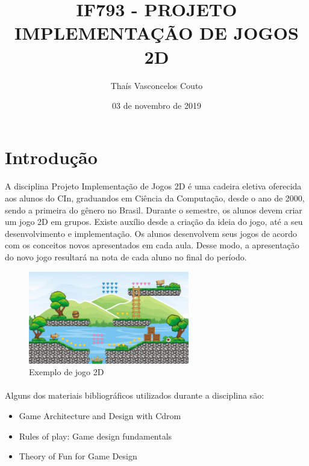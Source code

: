 \documentclass[10pt]{article}
\title{IF793 - PROJETO IMPLEMENTAÇÃO DE JOGOS 2D}
\author{Thaís Vasconcelos Couto}
\date{03 de novembro de 2019}
\begin{document}
\maketitle

\section{Introdução}
\paragraph{} A disciplina Projeto Implementação de Jogos 2D é uma cadeira eletiva oferecida aos alunos do CIn, graduandos em Ciência da Computação, desde o ano de 2000, sendo a primeira do gênero no Brasil. Durante o semestre, os alunos devem criar um jogo 2D em grupos. Existe auxílio desde a criação da ideia do jogo, até a seu desenvolvimento e implementação. Os alunos desenvolvem seus jogos de acordo com os conceitos novos apresentados em cada aula. Desse modo, a apresentação do novo jogo resultará na nota de cada aluno no final do período. 


\begin{figure}[h!]
\centering
\includegraphics[width = 7cm]{jogo2d.jpg}
\caption{Exemplo de jogo 2D}
\end{figure}

\paragraph{}Alguns dos materiais bibliográficos utilizados durante a disciplina são:
\begin{itemize}
    \item\cite{salen2004rules} Game Architecture and Design with Cdrom
    \item\cite{kostertheory} Rules of play: Game design fundamentals
    \item\cite{rollings1999game} Theory of Fun for Game Design
 \end{itemize}
\paragraph{}
\end{document}

